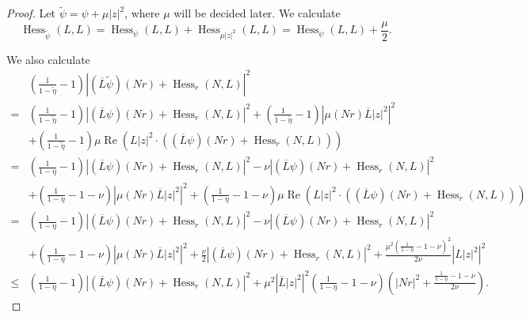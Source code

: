 \documentclass[11pt]{article}
\theoremstyle{plain} \numberwithin{equation}{section}
\theoremstyle{definition}
\DeclareMathOperator{\Hessian}{Hess}
\renewcommand{\Re}{\operatorname{Re}}
\begin{document}
\begin{proof}
	Let $\tilde{\psi}=\psi+\mu|z|^2$, where $\mu$ will be decided later. We calculate 
	\[\Hessian_{\tilde{\psi}}(L, L)=\Hessian_\psi(L, L)+\Hessian_{\mu|z|^2}(L, L)=\Hessian_\psi(L, L)+\frac{\mu}{2}.\]
	
	We also calculate \[\begin{split}
	&\left(\frac{1}{1-\tilde{\eta}}-1\right)\left|(\overline{L}\tilde{\psi})(Nr)+\Hessian_r(N, L)\right|^2\\=&\left(\frac{1}{1-\tilde{\eta}}-1\right)\left|(\overline{L}\psi)(Nr)+\Hessian_r(N, L)\right|^2+\left(\frac{1}{1-\tilde{\eta}}-1\right)\left|\mu(Nr)\overline{L}|z|^2\right|^2\\&+\left(\frac{1}{1-\tilde{\eta}}-1\right)\mu\Re\left(L|z|^2\cdot\left((\overline{L}\psi)(Nr)+\Hessian_r(N, L)\right)\right)\\=&\left(\frac{1}{1-\eta}-1\right)\left|(\overline{L}\psi)(Nr)+\Hessian_r(N, L)\right|^2-\nu\left|(\overline{L}\psi)(Nr)+\Hessian_r(N, L)\right|^2\\&+\left(\frac{1}{1-\eta}-1-\nu\right)\left|\mu(Nr)\overline{L}|z|^2\right|^2+\left(\frac{1}{1-\eta}-1-\nu\right)\mu\Re\left(L|z|^2\cdot\left((\overline{L}\psi)(Nr)+\Hessian_r(N, L)\right)\right)\\=&\left(\frac{1}{1-\eta}-1\right)\left|(\overline{L}\psi)(Nr)+\Hessian_r(N, L)\right|^2-\nu\left|(\overline{L}\psi)(Nr)+\Hessian_r(N, L)\right|^2\\&+\left(\frac{1}{1-\eta}-1-\nu\right)\left|\mu(Nr)\overline{L}|z|^2\right|^2+\frac{\nu}{2}\left|(\overline{L}\psi)(Nr)+\Hessian_r(N, L)\right|^2+\frac{\mu^2\left(\frac{1}{1-\eta}-1-\nu\right)^2}{2\nu}\left|L|z|^2\right|^2\\\leq&\left(\frac{1}{1-\eta}-1\right)\left|(\overline{L}\psi)(Nr)+\Hessian_r(N, L)\right|^2+\mu^2\left|\overline{L}|z|^2\right|^2\left(\frac{1}{1-\eta}-1-\nu\right)\left(|Nr|^2+\frac{\frac{1}{1-\eta}-1-\nu}{2\nu}\right).
	\end{split}\]
	

\end{proof}
\end{document}
